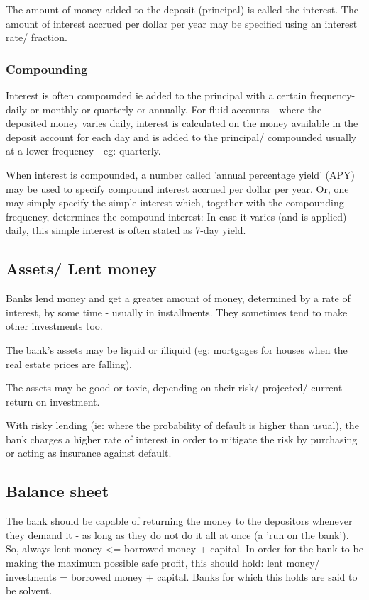 \documentclass[oneside, article]{memoir}
\begin{document}
The amount of money added to the deposit (principal) is called the interest. The amount of interest accrued per dollar per year may be specified using an interest rate/ fraction.

\subsubsection{Compounding}
Interest is often compounded ie added to the principal with a certain frequency- daily or monthly or quarterly or annually. For fluid accounts - where the deposited money varies daily, interest is calculated on the money available in the deposit account for each day and is added to the principal/ compounded usually at a lower frequency - eg: quarterly.

When interest is compounded, a number called 'annual percentage yield' (APY) may be used to specify compound interest accrued per dollar per year. Or, one may simply specify the simple interest which, together with the compounding frequency, determines the compound interest: In case it varies (and is applied) daily, this simple interest is often stated  as 7-day yield.

\subsection{Assets/ Lent money}
Banks lend money and get a greater amount of money, determined by a rate of interest, by some time - usually in installments. They sometimes tend to make other investments too.

The bank's assets may be liquid or illiquid (eg: mortgages for houses when the real estate prices are falling).

The assets may be good or toxic, depending on their risk/ projected/ current return on investment.

With risky lending (ie: where the probability of default is higher than usual), the bank charges a higher rate of interest in order to mitigate the risk by purchasing or acting as insurance against default.

\subsection{Balance sheet}
The bank should be capable of returning the money to the depositors whenever they demand it - as long as they do not do it all at once (a 'run on the bank'). So, always lent money <= borrowed money + capital. In order for the bank to be making the maximum possible safe profit, this should hold: lent money/ investments = borrowed money + capital. Banks for which this holds are said to be solvent.
\end{document}
